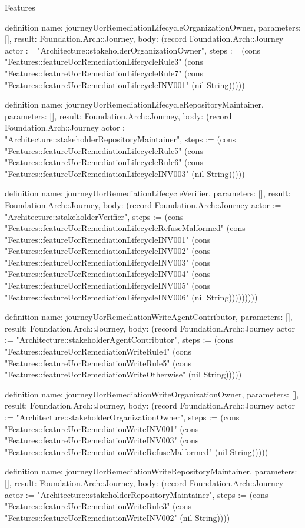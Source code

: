 \begin{lexlean}{Features}
\begin{semanticmodule}
definition{
  name: journeyUorRemediationLifecycleOrganizationOwner,
  parameters: [],
  result: Foundation.Arch::Journey,
  body: (record Foundation.Arch::Journey {actor := "Architecture::stakeholderOrganizationOwner", steps := (cons "Features::featureUorRemediationLifecycleRule3" (cons "Features::featureUorRemediationLifecycleRule7" (cons "Features::featureUorRemediationLifecycleINV001" (nil String))))})
}

definition{
  name: journeyUorRemediationLifecycleRepositoryMaintainer,
  parameters: [],
  result: Foundation.Arch::Journey,
  body: (record Foundation.Arch::Journey {actor := "Architecture::stakeholderRepositoryMaintainer", steps := (cons "Features::featureUorRemediationLifecycleRule5" (cons "Features::featureUorRemediationLifecycleRule6" (cons "Features::featureUorRemediationLifecycleINV003" (nil String))))})
}

definition{
  name: journeyUorRemediationLifecycleVerifier,
  parameters: [],
  result: Foundation.Arch::Journey,
  body: (record Foundation.Arch::Journey {actor := "Architecture::stakeholderVerifier", steps := (cons "Features::featureUorRemediationLifecycleRefuseMalformed" (cons "Features::featureUorRemediationLifecycleINV001" (cons "Features::featureUorRemediationLifecycleINV002" (cons "Features::featureUorRemediationLifecycleINV003" (cons "Features::featureUorRemediationLifecycleINV004" (cons "Features::featureUorRemediationLifecycleINV005" (cons "Features::featureUorRemediationLifecycleINV006" (nil String))))))))})
}

definition{
  name: journeyUorRemediationWriteAgentContributor,
  parameters: [],
  result: Foundation.Arch::Journey,
  body: (record Foundation.Arch::Journey {actor := "Architecture::stakeholderAgentContributor", steps := (cons "Features::featureUorRemediationWriteRule4" (cons "Features::featureUorRemediationWriteRule5" (cons "Features::featureUorRemediationWriteOtherwise" (nil String))))})
}

definition{
  name: journeyUorRemediationWriteOrganizationOwner,
  parameters: [],
  result: Foundation.Arch::Journey,
  body: (record Foundation.Arch::Journey {actor := "Architecture::stakeholderOrganizationOwner", steps := (cons "Features::featureUorRemediationWriteINV001" (cons "Features::featureUorRemediationWriteINV003" (cons "Features::featureUorRemediationWriteRefuseMalformed" (nil String))))})
}

definition{
  name: journeyUorRemediationWriteRepositoryMaintainer,
  parameters: [],
  result: Foundation.Arch::Journey,
  body: (record Foundation.Arch::Journey {actor := "Architecture::stakeholderRepositoryMaintainer", steps := (cons "Features::featureUorRemediationWriteRule3" (cons "Features::featureUorRemediationWriteINV002" (nil String)))})
}


\end{semanticmodule}
\end{lexlean}
